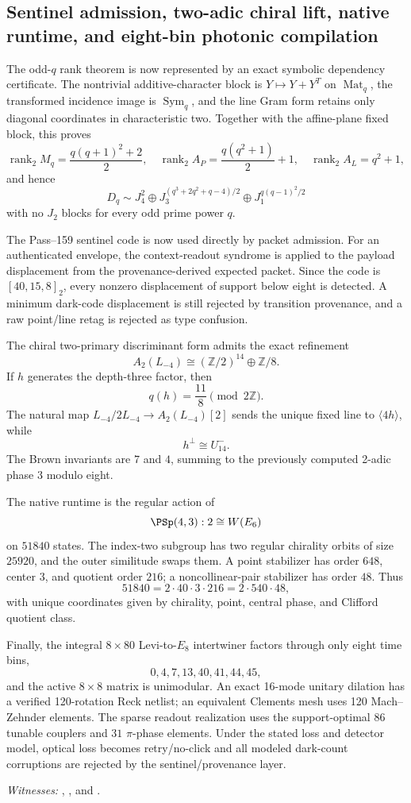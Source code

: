 \subsection{Sentinel admission, two-adic chiral lift, native runtime, and eight-bin photonic compilation}
\label{sec:levi-next5-v2}

The odd-$q$ rank theorem is now represented by an exact symbolic dependency
certificate. The nontrivial additive-character block is
$Y\mapsto Y+Y^T$ on $\operatorname{Mat}_q$, the transformed incidence image is
$\operatorname{Sym}_q$, and the line Gram form retains only diagonal
coordinates in characteristic two. Together with the affine-plane fixed block,
this proves
\[
 \operatorname{rank}_2M_q=\frac{q(q+1)^2+2}{2},\quad
 \operatorname{rank}_2A_P=\frac{q(q^2+1)}2+1,\quad
 \operatorname{rank}_2A_L=q^2+1,
\]
and hence
\[
 D_q\sim J_4^2\oplus J_3^{(q^3+2q^2+q-4)/2}
 \oplus J_1^{q(q-1)^2/2}
\]
with no $J_2$ blocks for every odd prime power $q$.

The Pass--159 sentinel code is now used directly by packet admission. For an
authenticated envelope, the context-readout syndrome is applied to the payload
displacement from the provenance-derived expected packet. Since the code is
$[40,15,8]_2$, every nonzero displacement of support below eight is detected.
A minimum dark-code displacement is still rejected by transition provenance,
and a raw point/line retag is rejected as type confusion.

The chiral two-primary discriminant form admits the exact refinement
\[
 A_2(L_{-4})\cong(\mathbb Z/2)^{14}\oplus\mathbb Z/8.
\]
If $h$ generates the depth-three factor, then
\[
 q(h)=\frac{11}{8}\pmod{2\mathbb Z}.
\]
The natural map $L_{-4}/2L_{-4}\to A_2(L_{-4})[2]$ sends the unique fixed line
to $\langle4h\rangle$, while
\[
 h^\perp\cong U_{14}^-.
\]
The Brown invariants are $7$ and $4$, summing to the previously computed
2-adic phase $3$ modulo eight.

The native runtime is the regular action of
\[
 \PSp(4,3):2\cong W(E_6)
\]
on $51840$ states. The index-two subgroup has two regular chirality orbits of
size $25920$, and the outer similitude swaps them. A point stabilizer has order
$648$, center $3$, and quotient order $216$; a noncollinear-pair stabilizer has
order $48$. Thus
\[
 51840=2\cdot40\cdot3\cdot216=2\cdot540\cdot48,
\]
with unique coordinates given by chirality, point, central phase, and Clifford
quotient class.

Finally, the integral $8\times80$ Levi-to-$E_8$ intertwiner factors through only
eight time bins,
\[
 0,4,7,13,40,41,44,45,
\]
and the active $8\times8$ matrix is unimodular. An exact 16-mode unitary
dilation has a verified 120-rotation Reck netlist; an equivalent Clements mesh
uses 120 Mach--Zehnder elements. The sparse readout realization uses the
support-optimal $86$ tunable couplers and $31$ $\pi$-phase elements. Under the
stated loss and detector model, optical loss becomes retry/no-click and all
modeled dark-count corruptions are rejected by the sentinel/provenance layer.

\emph{Witnesses:}
,
, and
.
